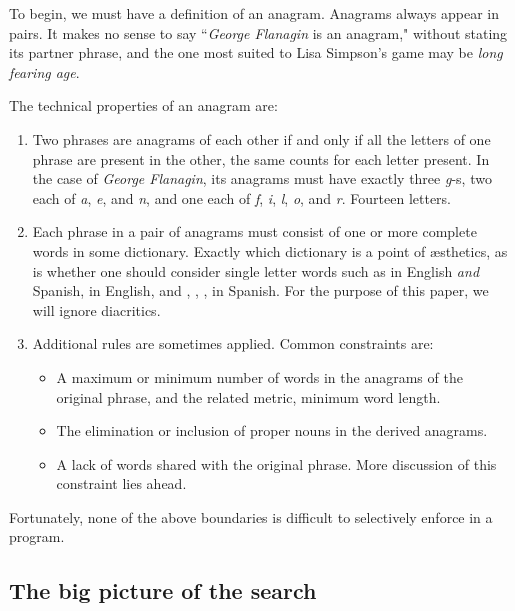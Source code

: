 \documentclass[letterpaper, 11pt]{article}
\begin{document}
To begin, we must have a definition of an anagram. Anagrams
always appear in pairs.  It makes no sense to say ``\emph{George
Flanagin} is an anagram," without stating its partner phrase, and the
one most suited to Lisa Simpson's game may be
\emph{long fearing age}. 

The technical properties of an anagram are:

\begin{enumerate}
\item Two phrases are anagrams of each other if and only if all the letters of
one phrase are present in the other, the same counts for each letter
present.
In the case of \emph{George Flanagin}, its
anagrams must have exactly three \emph{g}-s, two each of \emph{a},
\emph{e}, and \emph{n}, and one each of \emph{f}, \emph{i}, \emph{l},
\emph{o}, and \emph{r}.  Fourteen letters.

\item Each phrase in a pair of anagrams must consist of one or more
complete words in some dictionary.  Exactly which dictionary is a
point of {\ae}sthetics, as is whether one should consider single
letter words such as  in English \emph{and} Spanish, 
in English, and , , ,  in Spanish.  For
the purpose of this paper, we will ignore diacritics.

\item Additional rules are sometimes applied. Common constraints are:

\begin{itemize}
\item A maximum or minimum number of words in the anagrams of the original phrase,
and the related metric, minimum word length.

\item The elimination or inclusion of proper nouns in the derived
anagrams.

\item A lack of words shared with the original phrase. More discussion of this 
constraint lies ahead.
\end{itemize}
\end{enumerate}

Fortunately, none of the above boundaries is difficult to selectively
enforce in a program. 

\subsection{The big picture of the search}
\label{sec:bigpicture}
\end{document}
